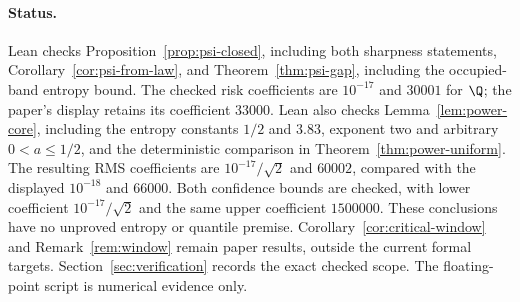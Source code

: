 \paragraph{Status.}
Lean checks Proposition~\ref{prop:psi-closed}, including both sharpness
statements, Corollary~\ref{cor:psi-from-law}, and
Theorem~\ref{thm:psi-gap}, including the occupied-band entropy bound.
The checked risk coefficients are $10^{-17}$ and $30001$ for $\Q$;
the paper's display retains its coefficient $33000$.
Lean also checks Lemma~\ref{lem:power-core}, including the entropy
constants $1/2$ and $3.83$, exponent two and arbitrary $0<a\le1/2$,
and the deterministic comparison in Theorem~\ref{thm:power-uniform}.
The resulting RMS coefficients are $10^{-17}/\sqrt2$ and $60002$,
compared with the displayed $10^{-18}$ and $66000$. Both confidence
bounds are checked, with lower coefficient $10^{-17}/\sqrt2$ and the
same upper coefficient $1500000$. These conclusions have no unproved
entropy or quantile premise.
Corollary~\ref{cor:critical-window} and
Remark~\ref{rem:window} remain paper results, outside the current formal
targets. Section~\ref{sec:verification} records the exact checked scope.
The floating-point script
 is numerical evidence only.
